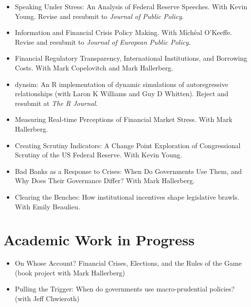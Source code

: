 \documentclass[a4paper]{article}
\begin{document}
{\begin{itemize}

    \item Speaking Under Stress: An Analysis of Federal Reserve Speeches. With Kevin Young. Revise and resubmit to \emph{Journal of Public Policy}.

    \item Information and Financial Crisis Policy Making. With M\'{i}ch\'{e}al O'Keeffe. Revise and resubmit to \emph{Journal of European Public Policy}.

    \item Financial Regulatory Transparency, International Institutions, and Borrowing Costs. With Mark Copelovitch and Mark Hallerberg.

    \item dynsim: An R implementation of dynamic simulations of autoregressive relationships (with Laron K Williams and Guy D Whitten). Reject and resubmit at \emph{The R Journal}.

    \item Measuring Real-time Perceptions of Financial Market Stress. With Mark Hallerberg.

    \item Creating Scrutiny Indicators: A Change Point Exploration of Congressional Scrutiny of the US Federal Reserve. With Kevin Young.

    \item Bad Banks as a Response to Crises: When Do Governments Use Them, and Why Does Their Governance Differ? With Mark Hallerberg.

    \item Clearing the Benches: How institutional incentives shape legislative brawls. With Emily Beaulieu.

\end{itemize}

\section*{Academic Work in Progress}

\begin{itemize}

    \item On Whose Account? Financial Crises, Elections, and the Rules of the Game (book project with Mark Hallerberg)

    \item Pulling the Trigger: When do governments use macro-prudential policies? (with Jeff Chwieroth)


\end{itemize}}
\end{document}
